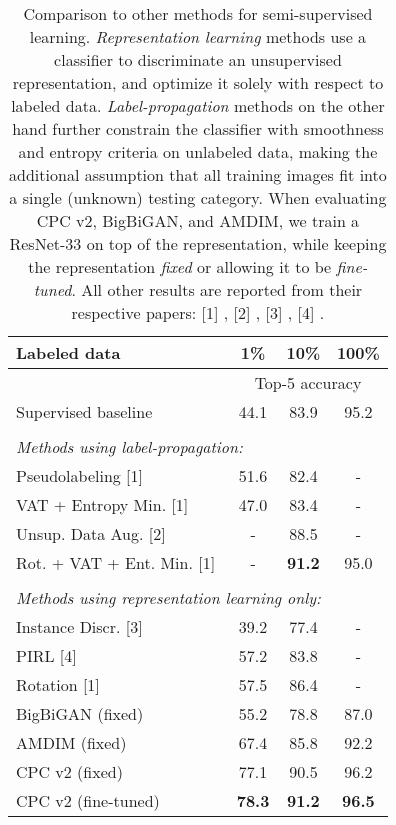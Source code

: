 \documentclass{article}
\begin{document}
\begin{table}[t]
\caption{Comparison to other methods for semi-supervised learning. \textit{Representation learning} methods use a classifier to discriminate an unsupervised representation, and optimize it solely with respect to labeled data. \textit{Label-propagation} methods on the other hand further constrain the classifier with smoothness and entropy criteria on unlabeled data, making the additional assumption that all training images fit into a single (unknown) testing category. When evaluating CPC v2, BigBiGAN, and AMDIM, we train a ResNet-33 on top of the representation, while keeping the representation \textit{fixed} or allowing it to be \textit{fine-tuned}. All other results are reported from their respective papers: [1] \citet{zhai2019s}, [2] \citet{xie2019unsupervised}, [3] \citet{wu2018unsupervised}, [4] \citet{misra2019pirl}.}
\label{tab:efficient2}
\vskip 0.15in
\begin{center}
\begin{small}
\begin{sc}
\begin{tabular}{l c c c }
\toprule
    Labeled data & 1\% & 10\% &  100\% \\
    \midrule
      & \multicolumn{3}{c}{Top-5 accuracy} \\ 
Supervised baseline & 44.1 & 83.9 & 95.2 \\ 
    \midrule \\
    \multicolumn{3}{l}{\textit{Methods using label-propagation:}} \\
    Pseudolabeling [1] & 51.6 &  82.4  & - \\    
    VAT + Entropy Min. [1] & 47.0  & 83.4  & -\\ 
    Unsup. Data Aug. [2]  & -  & 88.5  & -\\ 
    Rot. + VAT + Ent. Min. [1]  & -  &\textbf{91.2} & 95.0 \\ 
    \midrule \\
    \multicolumn{3}{l}{\textit{Methods using representation learning only:}} \\
    Instance Discr. [3]& 39.2 & 77.4  & -\\
    PIRL [4] & 57.2 & 83.8 & - \\ 
    Rotation [1]  & 57.5 & 86.4  & - \\ 
  BigBiGAN (fixed) & 55.2 & 78.8  & 87.0 \\ 
  AMDIM (fixed)  & 67.4  & 85.8  & 92.2 \\
    \midrule 
    CPC v2 (fixed)  &  77.1  & 90.5  & 96.2 \\ 
    CPC v2 (fine-tuned)  & \textbf{78.3}  & \textbf{91.2} & \textbf{96.5}\\
\bottomrule
\end{tabular}
\end{sc}
\end{small}
\end{center}
\end{table}
 
\end{document}

